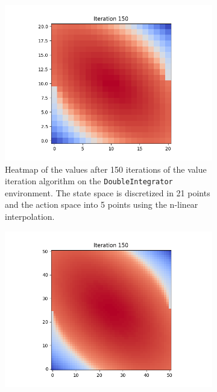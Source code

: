 \documentclass{article}
\begin{document}
\begin{enumerate}[(a)]
\begin{figure}[h!]
    \centering
    \begin{subfigure}{0.3\textwidth}
        \centering
        \includegraphics[width=\textwidth]{figures/part_2_b_a.png}
        \caption{Heatmap of the values after 150 iterations of the value iteration algorithm on the \texttt{DoubleIntegrator} environment. 
                The state space is discretized in 21 points and the action space into 5 points using the n-linear interpolation.}
    \end{subfigure}
    \hspace{0.1 in}
    \begin{subfigure}{0.3\textwidth}
        \centering
        \includegraphics[width=\textwidth]{figures/part_2_b_b.png}

\end{subfigure}
\end{figure}
\end{enumerate}
\end{document}
